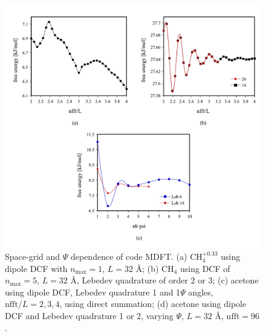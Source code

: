 \begin{figure}[!tbph]
\begin{centering}
\includegraphics[bb=0bp 20bp 567bp 519bp,width=0.9\columnwidth]{_figure/results/grid_reso}
\par\end{centering}
\caption[Space-grid and $\Psi$ dependence of code MDFT]{Space-grid and $\Psi$ dependence of code \acs{MDFT}. (a) $\mathrm{CH_{4}^{+0.33}}$
using dipole \acs{DCF} with $n_{\max}=1$, $L=32$ $\textrm{Å}$;
(b) $\mathrm{CH_{4}}$ using \acs{DCF} of $n_{\max}=5$, $L=32$
$\textrm{Å}$, Lebedev quadrature of order 2 or 3; (c) acetone using
dipole \acs{DCF}, Lebedev quadrature 1 and 1$\Psi$ angles, $\mathrm{nfft}/L=2,3,4$,
using direct summation; (d) acetone using dipole \acs{DCF} and Lebedev
quadrature 1 or 2, varying $\Psi$, $L=32$ $\textrm{Å}$, $\mathrm{nfft}=96$.\label{fig:Space-grid-and-psi-dependence}}
\end{figure}

